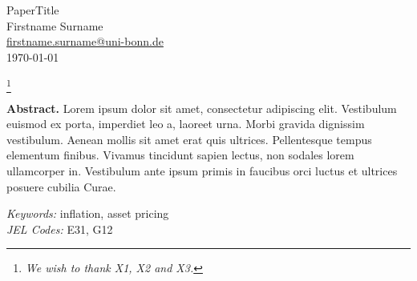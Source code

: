 \documentclass[11pt,a4paper]{article}
\newcommand\blfootnote[1]{%
  \begingroup
  \renewcommand\thefootnote{}\footnote{#1}%
  \addtocounter{footnote}{-1}%
  \endgroup
}
\begin{document}
\vspace*{0.5cm}

\thispagestyle{empty} %

\begin{center}
{\LARGE PaperTitle}\\[0.4cm]
 {\large Firstname Surname}\\[0.2cm]
  {\large \href{mailto:firstname.surname@uni-bonn.de}{firstname.surname@uni-bonn.de}}\\[0.2cm]
 {\large \today}\\
\end{center}

\blfootnote{\textit{\textbullet \phantom{a} We wish to thank X1, X2 and X3.}}

\vspace*{-0.1cm}
\begin{center}
\begin{minipage}{0.9\textwidth}
\textbf{Abstract.} Lorem ipsum dolor sit amet, consectetur adipiscing elit. Vestibulum euismod ex porta, imperdiet leo a, laoreet urna. Morbi gravida dignissim vestibulum. Aenean mollis sit amet erat quis ultrices. Pellentesque tempus elementum finibus. Vivamus tincidunt sapien lectus, non sodales lorem ullamcorper in. Vestibulum ante ipsum primis in faucibus orci luctus et ultrices posuere cubilia Curae.\\[0.3cm]
\begin{footnotesize}
\textit{Keywords:} inflation, asset pricing\\
\textit{JEL Codes:} E31, G12\\
\end{footnotesize}
\end{minipage}
\end{center}




\end{document}
